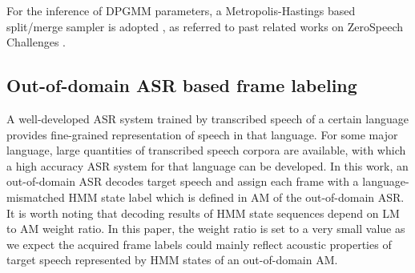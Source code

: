 \documentclass[a4paper]{article}
\begin{document}
For the inference of DPGMM parameters, a Metropolis-Hastings based split/merge sampler is adopted \cite{chang2013parallel}, as referred to past related works on ZeroSpeech Challenges \cite{heck2017feature,chen2015parallel}.
\subsection{Out-of-domain ASR based frame labeling}
A well-developed ASR system trained by transcribed speech of a certain language provides fine-grained representation of speech in that language. For some major language, large quantities of transcribed speech corpora are available, with which a high accuracy ASR system for that language can be developed.
In this work, an out-of-domain ASR decodes target speech and 
assign each frame with a language-mismatched  HMM state label which is defined in AM of the out-of-domain ASR.
It is worth noting that decoding results of HMM state sequences depend on LM to AM weight ratio. In this paper, the weight ratio is set to a very small value  as we expect the acquired frame labels could mainly reflect acoustic properties of target speech represented by HMM states of an out-of-domain AM.
\end{document}
